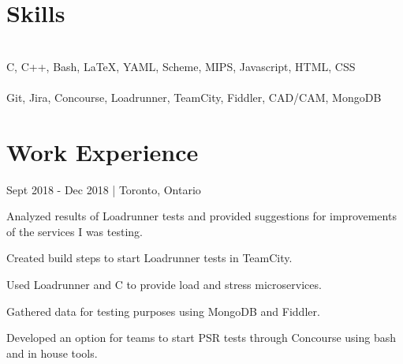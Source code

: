 \documentclass[]{formatting}
\begin{document}
\begin{minipage}[c]{0.3\linewidth}


\vskip10pt
\section{Skills}
\begin{flushleft} 
\\
\textcolor{bold} {C}, \space
\textcolor{bold} {C++}, \space
\textcolor{bold} {Bash}, \space
\textcolor{bold} {\LaTeX}, \space
\textcolor{bold} {YAML}, \space
\textcolor{bold} {Scheme}, \space 
\textcolor{bold} {MIPS}, \space
\textcolor{bold} {Javascript}, \space
\textcolor{bold} {HTML}, \space
\textcolor{bold} {CSS} \space\\
\vskip 5pt
\\
\textcolor{bold} {Git}, \space
\textcolor{bold} {Jira}, \space
\textcolor{bold} {Concourse}, \space
\textcolor{bold} {Loadrunner}, \space
\textcolor{bold} {TeamCity}, \space
\textcolor{bold} {Fiddler}, \space
\textcolor{bold} {CAD/CAM}, \space
\textcolor{bold} {MongoDB} 
\end{flushleft}
\end{minipage}



\section{Work  Experience}

 { Sept 2018 - Dec 2018 | Toronto, Ontario}
\begin{tightemize}
\item Analyzed results of Loadrunner tests and provided suggestions for improvements of the services I was testing. 
\item Created build steps to start Loadrunner tests in TeamCity. 
\item Used Loadrunner and C to provide load and stress microservices. 
\item Gathered data for testing purposes using MongoDB and Fiddler.
\item Developed an option for teams to start PSR tests through Concourse using bash and in house tools. 
\end{tightemize}
\sectionsep
\end{document}
